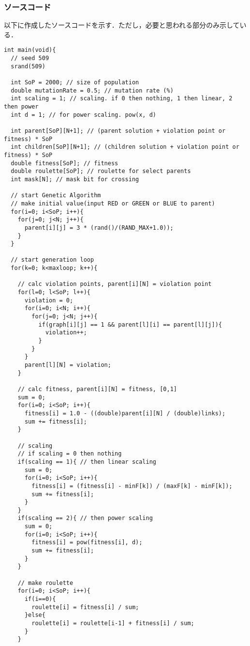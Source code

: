 \documentclass[a4j]{jarticle}
\begin{document}
\subsubsection*{ソースコード}
以下に作成したソースコードを示す．ただし，必要と思われる部分のみ示してい
る．
\begin{lstlisting}[caption=GA.c, label=GA.c, xleftmargin=1cm]
int main(void){  
  // seed 509
  srand(509)

  int SoP = 2000; // size of population 
  double mutationRate = 0.5; // mutation rate (%)
  int scaling = 1; // scaling. if 0 then nothing, 1 then linear, 2 then power
  int d = 1; // for power scaling. pow(x, d)

  int parent[SoP][N+1]; // (parent solution + violation point or fitness) * SoP
  int children[SoP][N+1]; // (children solution + violation point or fitness) * SoP
  double fitness[SoP]; // fitness
  double roulette[SoP]; // roulette for select parents
  int mask[N]; // mask bit for crossing
  
  // start Genetic Algorithm
  // make initial value(input RED or GREEN or BLUE to parent)
  for(i=0; i<SoP; i++){
    for(j=0; j<N; j++){
      parent[i][j] = 3 * (rand()/(RAND_MAX+1.0));
    }
  }
  
  // start generation loop
  for(k=0; k<maxloop; k++){

    // calc violation points, parent[i][N] = violation point
    for(l=0; l<SoP; l++){
      violation = 0;
      for(i=0; i<N; i++){      
        for(j=0; j<N; j++){
          if(graph[i][j] == 1 && parent[l][i] == parent[l][j]){
            violation++;
          }
        }
      }
      parent[l][N] = violation;
    }
    
    // calc fitness, parent[i][N] = fitness, [0,1]
    sum = 0;
    for(i=0; i<SoP; i++){
      fitness[i] = 1.0 - ((double)parent[i][N] / (double)links);
      sum += fitness[i];
    }
    
    // scaling
    // if scaling = 0 then nothing
    if(scaling == 1){ // then linear scaling
      sum = 0;
      for(i=0; i<SoP; i++){
        fitness[i] = (fitness[i] - minF[k]) / (maxF[k] - minF[k]);
        sum += fitness[i];
      }
    }
    if(scaling == 2){ // then power scaling
      sum = 0;
      for(i=0; i<SoP; i++){
        fitness[i] = pow(fitness[i], d);
        sum += fitness[i];
      }
    }            
    
    // make roulette
    for(i=0; i<SoP; i++){
      if(i==0){
        roulette[i] = fitness[i] / sum;
      }else{
        roulette[i] = roulette[i-1] + fitness[i] / sum;
      }
    }
    

\end{lstlisting}
\end{document}
